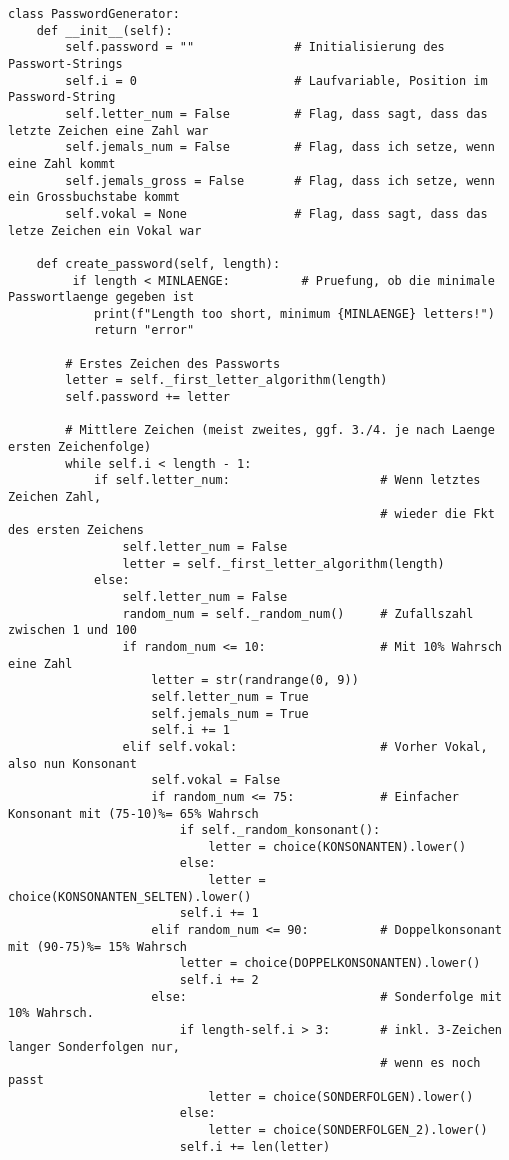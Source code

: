 \documentclass[a4paper,10pt,ngerman]{scrartcl}
\begin{document}
\begin{lstlisting}
class PasswordGenerator:
    def __init__(self):
        self.password = ""              # Initialisierung des Passwort-Strings
        self.i = 0                      # Laufvariable, Position im Password-String
        self.letter_num = False         # Flag, dass sagt, dass das letzte Zeichen eine Zahl war
        self.jemals_num = False         # Flag, dass ich setze, wenn eine Zahl kommt
        self.jemals_gross = False       # Flag, dass ich setze, wenn ein Grossbuchstabe kommt
        self.vokal = None               # Flag, dass sagt, dass das letze Zeichen ein Vokal war

    def create_password(self, length):
         if length < MINLAENGE:          # Pruefung, ob die minimale Passwortlaenge gegeben ist
            print(f"Length too short, minimum {MINLAENGE} letters!")
            return "error"

        # Erstes Zeichen des Passworts
        letter = self._first_letter_algorithm(length)
        self.password += letter

        # Mittlere Zeichen (meist zweites, ggf. 3./4. je nach Laenge ersten Zeichenfolge)
        while self.i < length - 1:
            if self.letter_num:                     # Wenn letztes Zeichen Zahl, 
                                                    # wieder die Fkt des ersten Zeichens
                self.letter_num = False
                letter = self._first_letter_algorithm(length)
            else:
                self.letter_num = False
                random_num = self._random_num()     # Zufallszahl zwischen 1 und 100
                if random_num <= 10:                # Mit 10% Wahrsch eine Zahl
                    letter = str(randrange(0, 9))
                    self.letter_num = True
                    self.jemals_num = True
                    self.i += 1
                elif self.vokal:                    # Vorher Vokal, also nun Konsonant
                    self.vokal = False
                    if random_num <= 75:            # Einfacher Konsonant mit (75-10)%= 65% Wahrsch
                        if self._random_konsonant():
                            letter = choice(KONSONANTEN).lower()
                        else:
                            letter = choice(KONSONANTEN_SELTEN).lower()
                        self.i += 1
                    elif random_num <= 90:          # Doppelkonsonant mit (90-75)%= 15% Wahrsch
                        letter = choice(DOPPELKONSONANTEN).lower()
                        self.i += 2
                    else:                           # Sonderfolge mit 10% Wahrsch.
                        if length-self.i > 3:       # inkl. 3-Zeichen langer Sonderfolgen nur,
                                                    # wenn es noch passt
                            letter = choice(SONDERFOLGEN).lower()
                        else:
                            letter = choice(SONDERFOLGEN_2).lower()
                        self.i += len(letter)


\end{lstlisting}
\end{document}
